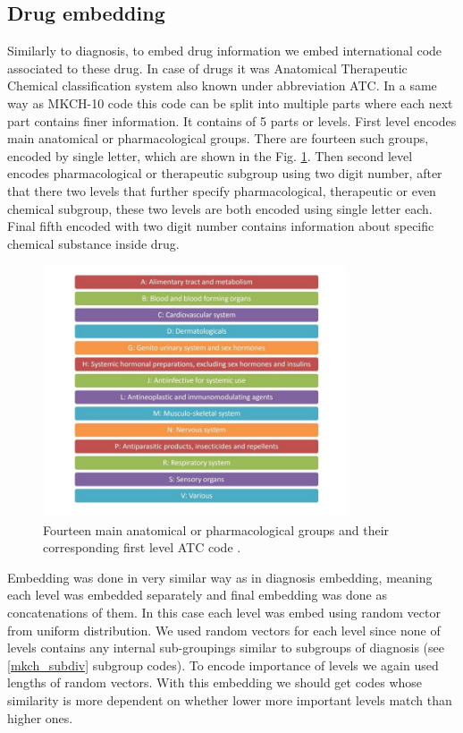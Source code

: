 \subsection{Drug embedding}
\label{drugEmb}

Similarly to diagnosis, to embed drug information we embed international code associated to these drug. In case of drugs it was Anatomical Therapeutic Chemical classification system also known under abbreviation ATC. In a same way as MKCH-10 code this code can be split into multiple parts where each next part contains finer information. It contains of 5 parts or levels. First level encodes main anatomical or pharmacological groups. There are fourteen such groups, encoded by single letter, which are shown in the Fig. \ref{fig:atc_l1}. Then second level encodes pharmacological or therapeutic subgroup using two digit number, after that there two levels that further specify pharmacological, therapeutic or even chemical subgroup, these two levels are both encoded using single letter each. Final fifth encoded with two digit number contains information about specific chemical substance inside drug.

\begin{figure}[!h]
	\centering
	
	\includegraphics[width=0.8\textwidth]{images/atc_l1_classification_who.jpg}
	
	\caption{Fourteen main anatomical or pharmacological groups and their corresponding first level ATC code \cite{atc_who}.}
	\label{fig:atc_l1}
\end{figure}

Embedding was done in very similar way as in diagnosis embedding, meaning each level was embedded separately and final embedding was done as concatenations of them. In this case each level was embed using random vector from uniform distribution. We used random vectors for each level since none of levels contains any internal sub-groupings similar to subgroups of diagnosis (see \ref{mkch_subdiv} subgroup codes). To encode importance of levels we again used lengths of random vectors. With this embedding we should get codes whose similarity is more dependent on whether lower more important levels match than higher ones.
\\


